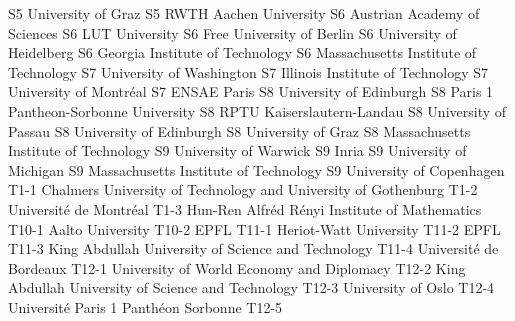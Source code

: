 \begin{multicols}{2}
{S5}
{}
{University of Graz}
{S5}
{}
{RWTH Aachen University}
{S6}
{}
{Austrian Academy of Sciences}
{S6}
{}
{LUT University}
{S6}
{}
{Free University of Berlin}
{S6}
{}
{University of Heidelberg}
{S6}
{}
{Georgia Institute of Technology}
{S6}
{}
{Massachusetts Institute of Technology}
{S7}
{}
{University of Washington}
{S7}
{}
{Illinois Institute of Technology}
{S7}
{}
{University of Montréal}
{S7}
{}
{ENSAE Paris}
{S8}
{}
{University of Edinburgh}
{S8}
{}
{Paris 1 Pantheon-Sorbonne University}
{S8}
{}
{RPTU Kaiserslautern-Landau}
{S8}
{}
{University of Passau}
{S8}
{}
{University of Edinburgh}
{S8}
{}
{University of Graz}
{S8}
{}
{Massachusetts Institute of Technology}
{S9}
{}
{University of Warwick}
{S9}
{}
{Inria}
{S9}
{}
{University of Michigan}
{S9}
{}
{Massachusetts Institute of Technology}
{S9}
{}
{University of Copenhagen}
{T1-1}
{}
{Chalmers University of Technology and University of Gothenburg}
{T1-2}
{}
{Université de Montréal}
{T1-3}
{}
{Hun-Ren Alfréd Rényi Institute of Mathematics}
{T10-1}
{}
{Aalto University}
{T10-2}
{}
{EPFL}
{T11-1}
{}
{Heriot-Watt University}
{T11-2}
{}
{EPFL}
{T11-3}
{}
{King Abdullah University of Science and Technology}
{T11-4}
{}
{Université de Bordeaux}
{T12-1}
{}
{University of World Economy and Diplomacy}
{T12-2}
{}
{King Abdullah University of Science and Technology}
{T12-3}
{}
{University of Oslo}
{T12-4}
{}
{Université Paris 1 Panthéon Sorbonne}
{T12-5}
{}

\end{multicols}
